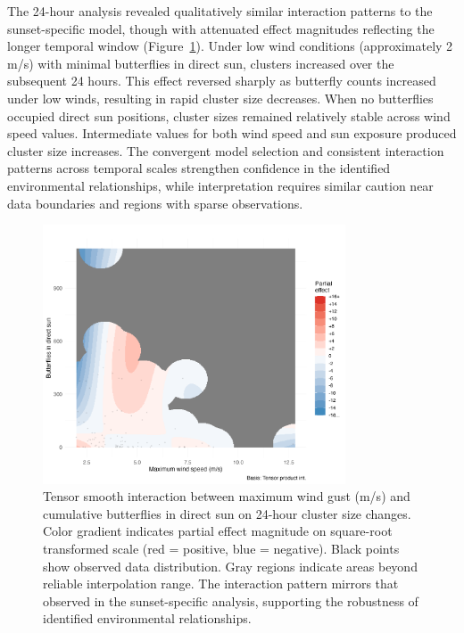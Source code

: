 The 24-hour analysis revealed qualitatively similar interaction patterns to the sunset-specific model, though with attenuated effect magnitudes reflecting the longer temporal window (Figure~\ref{fig:interaction_wind_sun_24hr}). Under low wind conditions (approximately 2 m/s) with minimal butterflies in direct sun, clusters increased over the subsequent 24 hours. This effect reversed sharply as butterfly counts increased under low winds, resulting in rapid cluster size decreases. When no butterflies occupied direct sun positions, cluster sizes remained relatively stable across wind speed values. Intermediate values for both wind speed and sun exposure produced cluster size increases. The convergent model selection and consistent interaction patterns across temporal scales strengthen confidence in the identified environmental relationships, while interpretation requires similar caution near data boundaries and regions with sparse observations.

\begin{figure}[htbp]
    \centering
    \includegraphics[width=0.8\textwidth]{supplemental/results/24hr/figures/interaction_wind_x_sun_binned.png}
    \caption{Tensor smooth interaction between maximum wind gust (m/s) and cumulative butterflies in direct sun on 24-hour cluster size changes. Color gradient indicates partial effect magnitude on square-root transformed scale (red = positive, blue = negative). Black points show observed data distribution. Gray regions indicate areas beyond reliable interpolation range. The interaction pattern mirrors that observed in the sunset-specific analysis, supporting the robustness of identified environmental relationships.}
    \label{fig:interaction_wind_sun_24hr}
\end{figure}